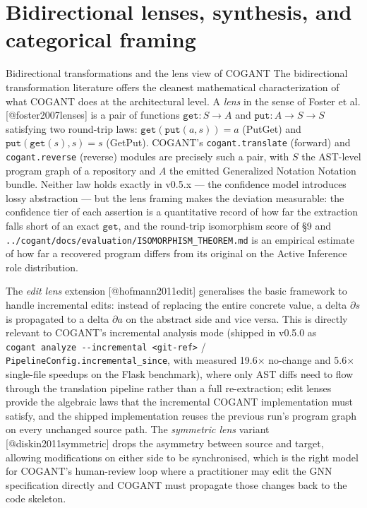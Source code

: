 \documentclass[
  ignorenonframetext,
]{beamer}
\author{\texorpdfstring{}{}}
\date{}
\begin{document}
\section{Bidirectional lenses, synthesis, and categorical
framing}\label{bidirectional-lenses-synthesis-and-categorical-framing}

\begin{frame}[fragile]{Bidirectional transformations and the lens view
of COGANT}
\protect{}\label{bidirectional-transformations-and-the-lens-view-of-cogant}
The bidirectional transformation literature offers the cleanest
mathematical characterization of what COGANT does at the architectural
level. A \emph{lens} in the sense of Foster et al.
{[}@foster2007lenses{]} is a pair of functions
\(\texttt{get} : S \to A\) and \(\texttt{put} : A \to S \to S\)
satisfying two round-trip laws: \(\texttt{get}(\texttt{put}(a, s)) = a\)
(PutGet) and \(\texttt{put}(\texttt{get}(s), s) = s\) (GetPut). COGANT's
\texttt{cogant.translate} (forward) and \texttt{cogant.reverse}
(reverse) modules are precisely such a pair, with \(S\) the AST-level
program graph of a repository and \(A\) the emitted Generalized Notation
Notation bundle. Neither law holds exactly in v0.5.x --- the confidence
model introduces lossy abstraction --- but the lens framing makes the
deviation measurable: the confidence tier of each assertion is a
quantitative record of how far the extraction falls short of an exact
\(\texttt{get}\), and the round-trip isomorphism score of §9 and
\texttt{../cogant/docs/evaluation/ISOMORPHISM\_THEOREM.md} is an
empirical estimate of how far a recovered program differs from its
original on the Active Inference role distribution.

The \emph{edit lens} extension {[}@hofmann2011edit{]} generalises the
basic framework to handle incremental edits: instead of replacing the
entire concrete value, a delta \(\partial s\) is propagated to a delta
\(\partial a\) on the abstract side and vice versa. This is directly
relevant to COGANT's incremental analysis mode (shipped in v0.5.0 as
\texttt{cogant\ analyze\ -\/-incremental\ \textless{}git-ref\textgreater{}}
/ \texttt{PipelineConfig.incremental\_since}, with measured
19.6\(\times\) no-change and 5.6\(\times\) single-file speedups on the
Flask benchmark), where only AST diffs need to flow through the
translation pipeline rather than a full re-extraction; edit lenses
provide the algebraic laws that the incremental COGANT implementation
must satisfy, and the shipped implementation reuses the previous run's
program graph on every unchanged source path. The \emph{symmetric lens}
variant {[}@diskin2011symmetric{]} drops the asymmetry between source
and target, allowing modifications on either side to be synchronised,
which is the right model for COGANT's human-review loop where a
practitioner may edit the GNN specification directly and COGANT must
propagate those changes back to the code skeleton.


\end{frame}
\end{document}

